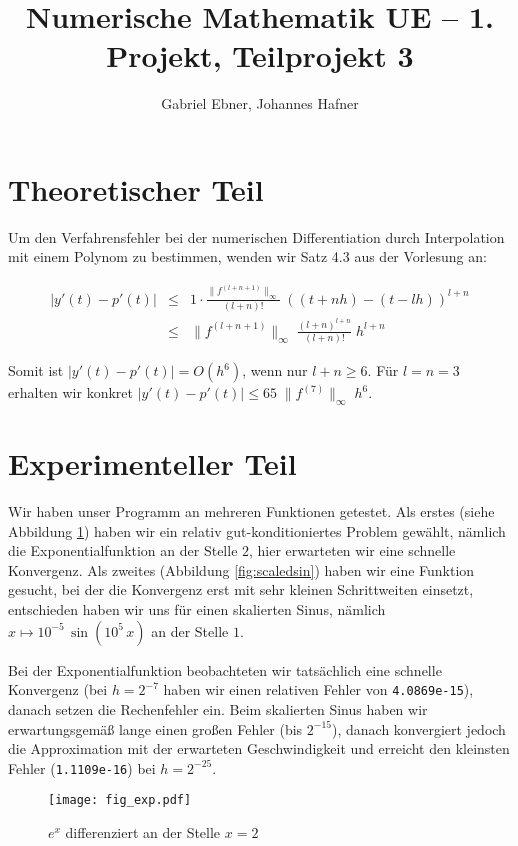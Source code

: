 \documentclass{scrartcl}
\begin{document}
\title{Numerische Mathematik UE -- 1. Projekt, Teilprojekt 3}
\author{Gabriel Ebner, Johannes Hafner}
\maketitle

\section{Theoretischer Teil}

Um den Verfahrensfehler bei der numerischen Differentiation durch Interpolation
mit einem Polynom zu bestimmen, wenden wir Satz 4.3 aus der Vorlesung an:

\begin{eqnarray*}
|y'(t) - p'(t)| &\leq& 1 \cdot
    \frac{\|f^{(l+n+1)}\|_\infty}{(l+n)!}\; ((t+nh) - (t-lh))^{l+n} \\
  &\leq& \|f^{(l+n+1)}\|_\infty\; \frac{(l+n)^{l+n}}{(l+n)!}\; h^{l+n}
\end{eqnarray*}

Somit ist \(|y'(t)-p'(t)| = O(h^6)\), wenn nur \(l+n \geq 6\).  Für \(l=n=3\)
erhalten wir konkret \(|y'(t)-p'(t)| \leq 65\; \|f^{(7)}\|_\infty\; h^6\).

\section{Experimenteller Teil}

Wir haben unser Programm an mehreren Funktionen getestet.  Als erstes (siehe
Abbildung \ref{fig:exp}) haben wir ein relativ gut-konditioniertes Problem
gewählt, nämlich die Exponentialfunktion an der Stelle \(2\), hier erwarteten
wir eine schnelle Konvergenz.  Als zweites (Abbildung \ref{fig:scaledsin})
haben wir eine Funktion gesucht, bei der die Konvergenz erst mit sehr kleinen
Schrittweiten einsetzt, entschieden haben wir uns für einen skalierten Sinus,
nämlich \(x \mapsto 10^{-5}\, \sin(10^5\, x)\) an der Stelle \(1\).

Bei der Exponentialfunktion beobachteten wir tatsächlich eine schnelle
Konvergenz (bei \(h=2^{-7}\) haben wir einen relativen Fehler von
\verb|4.0869e-15|), danach setzen die Rechenfehler ein.  Beim skalierten Sinus
haben wir erwartungsgemäß lange einen großen Fehler (bis \(2^{-15}\)), danach
konvergiert jedoch die Approximation mit der erwarteten Geschwindig\-keit und
erreicht den kleinsten Fehler (\verb|1.1109e-16|) bei \(h=2^{-25}\).

\begin{figure}[!htb]
\centering
\texttt{[image: fig\_exp.pdf]}
\caption{\(e^x\) differenziert an der Stelle \(x=2\)}
\label{fig:exp}
\end{figure}
\end{document}

